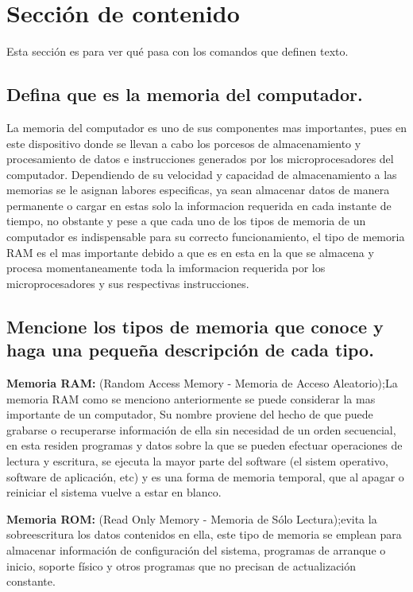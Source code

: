 \documentclass{article}
\begin{document}
\section{Sección de contenido} \label{contenido}
Esta sección es para ver qué pasa con los comandos que definen texto.
\subsection{Defina que es la memoria del computador.}
La memoria del computador es uno de sus componentes mas importantes, pues en este dispositivo donde se llevan a cabo los porcesos de almacenamiento y procesamiento de datos e instrucciones generados por los microprocesadores del computador. Dependiendo de su velocidad y capacidad de almacenamiento a las memorias se le asignan labores especificas, ya sean almacenar datos de manera permanente o cargar en estas solo la informacion requerida en cada instante de tiempo, no obstante y pese a que cada uno de los tipos de memoria de un computador es indispensable para su correcto funcionamiento, el tipo de memoria RAM es el mas importante debido a que es en esta en la que se almacena y procesa momentaneamente toda la imformacion requerida por los microprocesadores y sus respectivas instrucciones.

\subsection{Mencione los tipos de memoria que conoce y haga una pequeña descripción de cada tipo.}

\textbf{Memoria RAM:} (Random Access Memory - Memoria de Acceso Aleatorio);La memoria RAM como se menciono anteriormente se puede considerar la mas importante de un computador, Su nombre proviene del hecho de que puede grabarse o recuperarse información de ella sin necesidad de un orden secuencial, en esta residen programas y datos sobre la que se pueden efectuar operaciones de lectura y escritura, se ejecuta la mayor parte del software (el sistem operativo, software de aplicación, etc) y es una forma de memoria temporal, que al apagar o reiniciar el sistema vuelve a estar en blanco.

\vspace{0.5cm}


\textbf{Memoria ROM:} (Read Only Memory - Memoria de Sólo Lectura);evita la sobreescritura los datos contenidos en ella, este tipo de memoria se emplean para almacenar información de configuración del sistema, programas de arranque o inicio, soporte físico y otros programas que no precisan de actualización constante.
\end{document}
